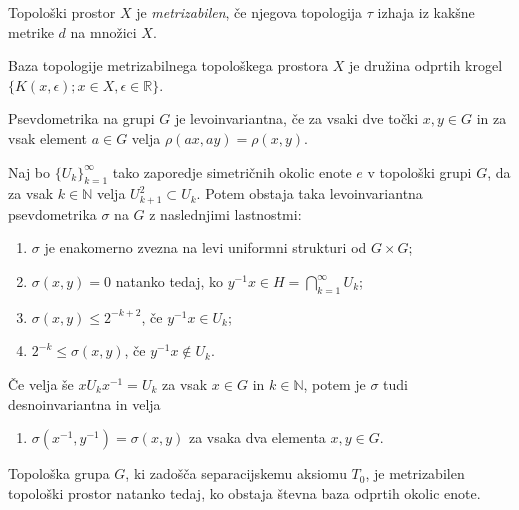 \documentclass[mat1]{fmfdelo}
\newcommand{\R}{\mathbb R}
\newcommand{\N}{\mathbb N}
\begin{document}
\begin{definicija}\label{def:metrizabilnost}
	Topološki prostor $X$ je \emph{metrizabilen}, če njegova topologija $\tau$ izhaja iz kakšne metrike $d$ na množici $X$.
\end{definicija}

\begin{opomba}
	Baza topologije metrizabilnega topološkega prostora $X$ je družina odprtih krogel $\lbrace K(x, \epsilon); x \in X, \epsilon \in \R \rbrace$.
\end{opomba}


\begin{definicija}
Psevdometrika na grupi $G$ je levoinvariantna, če za vsaki dve točki $x, y \in G$ in za vsak element $a \in G$ velja $\rho(ax, ay) = \rho(x, y)$.
\end{definicija}

\begin{izrek}\label{izr:pseudometrika}
	Naj bo $\lbrace U_k \rbrace_{k = 1}^{\infty}$ tako zaporedje simetričnih okolic enote $e$ v topološki grupi $G$, da za vsak $k \in \N$ velja $U_{k+1}^2 \subset U_k$. Potem obstaja taka levoinvariantna psevdometrika $\sigma$ na $G$ z naslednjimi lastnostmi:
	\begin{enumerate}
		\item $\sigma$ je enakomerno zvezna na levi uniformni strukturi od $G \times G$;\label{last:psevdo1}
		\item $\sigma (x, y) = 0$ natanko tedaj, ko $y^{-1}x \in H = \bigcap_{k=1}^{\infty} U_k$;\label{last:psevdo2}
		\item $\sigma (x, y) \leq 2^{-k+2}$, če $y^{-1}x \in U_k$;\label{last:psevdo3}
		\item $2^{-k} \leq \sigma (x, y)$, če $y^{-1}x \notin U_k$.\label{last:psevdo4}
	\end{enumerate}
	
	Če velja še $x U_k x^{-1} = U_k$ za vsak $x \in G$ in $k \in \N$, potem je $\sigma$ tudi desnoinvariantna in velja
	\begin{enumerate}[resume]
		\item $\sigma (x^{-1}, y^{-1}) = \sigma (x, y)$ za vsaka dva elementa $x, y \in G$.
	\end{enumerate}
\end{izrek}

\begin{izrek}\label{izr:metrizabilnost}
	Topološka grupa $G$, ki zadošča separacijskemu aksiomu $T_0$, je me\-tri\-za\-bi\-len topološki prostor natanko tedaj, ko obstaja števna baza odprtih okolic enote.
\end{izrek}
\end{document}
